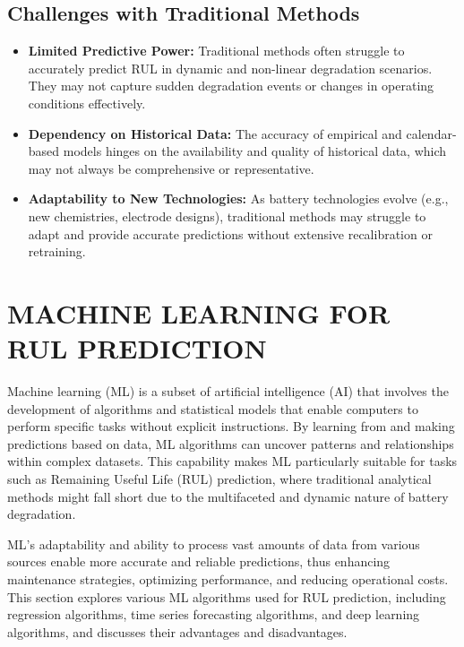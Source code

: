 \section{Challenges with Traditional Methods}

\begin{itemize}
    \item \textbf{Limited Predictive Power:} Traditional methods often struggle to accurately predict RUL in dynamic and non-linear degradation scenarios. They may not capture sudden degradation events or changes in operating conditions effectively.
    \item \textbf{Dependency on Historical Data:} The accuracy of empirical and calendar-based models hinges on the availability and quality of historical data, which may not always be comprehensive or representative.
    \item \textbf{Adaptability to New Technologies:} As battery technologies evolve (e.g., new chemistries, electrode designs), traditional methods may struggle to adapt and provide accurate predictions without extensive recalibration or retraining.
\end{itemize}


\chapter{MACHINE LEARNING FOR RUL PREDICTION}

\begin{justifying}
Machine learning (ML) is a subset of artificial intelligence (AI) that involves the development of algorithms and statistical models that enable computers to perform specific tasks without explicit instructions. By learning from and making predictions based on data, ML algorithms can uncover patterns and relationships within complex datasets. This capability makes ML particularly suitable for tasks such as Remaining Useful Life (RUL) prediction, where traditional analytical methods might fall short due to the multifaceted and dynamic nature of battery degradation.

ML's adaptability and ability to process vast amounts of data from various sources enable more accurate and reliable predictions, thus enhancing maintenance strategies, optimizing performance, and reducing operational costs. This section explores various ML algorithms used for RUL prediction, including regression algorithms, time series forecasting algorithms, and deep learning algorithms, and discusses their advantages and disadvantages.
\end{justifying}

